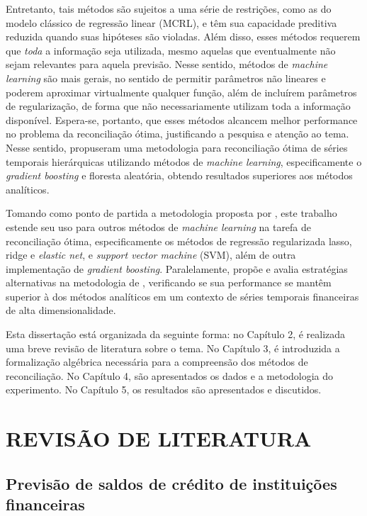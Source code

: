 \documentclass[
  12pt,
  twoside,
  openright,
  a4paper,
  chapter=TITLE,
  section=TITLE,
  brazil]{abntex2}
\begin{document}
Entretanto, tais métodos são sujeitos a uma série de restrições, como as
do modelo clássico de regressão linear (MCRL), e têm sua capacidade
preditiva reduzida quando suas hipóteses são violadas. Além disso, esses
métodos requerem que \emph{toda} a informação seja utilizada, mesmo
aquelas que eventualmente não sejam relevantes para aquela previsão.
Nesse sentido, métodos de \emph{machine learning} são mais gerais, no
sentido de permitir parâmetros não lineares e poderem aproximar
virtualmente qualquer função, além de incluírem parâmetros de
regularização, de forma que não necessariamente utilizam toda a
informação disponível. Espera-se, portanto, que esses métodos alcancem
melhor performance no problema da reconciliação ótima, justificando a
pesquisa e atenção ao tema. Nesse sentido,
\textcite{spiliotis_hierarchical_2021} propuseram uma metodologia para
reconciliação ótima de séries temporais hierárquicas utilizando métodos
de \emph{machine learning}, especificamente o \emph{gradient boosting} e
floresta aleatória, obtendo resultados superiores aos métodos
analíticos.

Tomando como ponto de partida a metodologia proposta por
\textcite{spiliotis_hierarchical_2021}, este trabalho estende seu uso
para outros métodos de \emph{machine learning} na tarefa de
reconciliação ótima, especificamente os métodos de regressão
regularizada lasso, ridge e \emph{elastic net}, e \emph{support vector
machine} (SVM), além de outra implementação de \emph{gradient boosting}.
Paralelamente, propõe e avalia estratégias alternativas na metodologia
de \textcite{spiliotis_hierarchical_2021}, verificando se sua
performance se mantêm superior à dos métodos analíticos em um contexto
de séries temporais financeiras de alta dimensionalidade.

Esta dissertação está organizada da seguinte forma: no Capítulo 2, é
realizada uma breve revisão de literatura sobre o tema. No Capítulo 3, é
introduzida a formalização algébrica necessária para a compreensão dos
métodos de reconciliação. No Capítulo 4, são apresentados os dados e a
metodologia do experimento. No Capítulo 5, os resultados são
apresentados e discutidos.

\section{REVISÃO DE LITERATURA}\label{revisuxe3o-de-literatura}

\subsection{Previsão de saldos de crédito de instituições
financeiras}\label{previsuxe3o-de-saldos-de-cruxe9dito-de-instituiuxe7uxf5es-financeiras-1}
\end{document}
